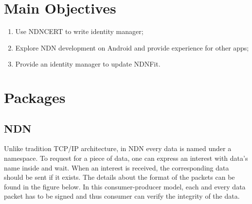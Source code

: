 \documentclass[a0,portrait]{poster}
\begin{document}
\begin{multicols}{2}
\section*{Main Objectives}

\begin{enumerate}
\item Use NDNCERT to write identity manager;
\item Explore NDN development on Android and provide experience for other apps;
\item Provide an identity manager to update NDNFit.
\end{enumerate}


\section*{Packages}


\subsection*{NDN\cite{zhang2014named}}
\par
	Unlike tradition TCP/IP architecture, in NDN every data is named under a namespace. 
	To request for a piece of data, one can express an interest with data's name inside and wait.
	When an interest is received, the corresponding data should be sent if it exists. 
	The details about the format of the packets can be found in the figure below.
	In this consumer-producer model, each and every data packet has to be signed and thus consumer can verify the integrity of the data.


\end{multicols}
\end{document}
